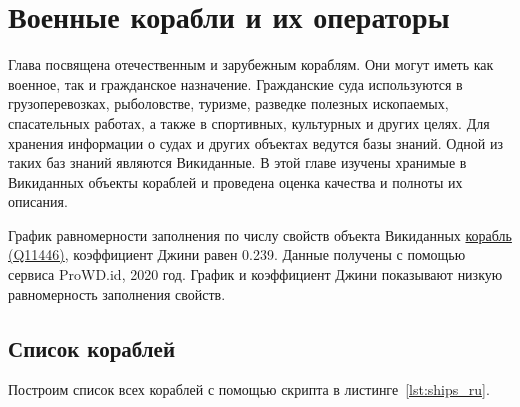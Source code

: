 \chapter{Военные корабли и их операторы}
\label{ch:ships-chapter}

Глава посвящена отечественным и зарубежным кораблям. Они могут иметь как военное, так и гражданское назначение. Гражданские суда используются в грузоперевозках, рыболовстве, туризме, разведке полезных ископаемых, спасательных работах, а также в спортивных, культурных и других целях. Для хранения информации о судах и других объектах ведутся базы знаний. Одной из таких баз знаний являются Викиданные. В этой главе изучены хранимые в Викиданных объекты кораблей и проведена оценка качества и полноты их описания.


\begin{marginfigure}[0.0cm]
  {
    \setlength{\fboxsep}{0pt}%
    \setlength{\fboxrule}{1pt}%
  }
  \caption[График равномерности заполнения свойств объектов Викиданных.]{График равномерности заполнения по числу свойств объекта Викиданных \href{https://www.wikidata.org/wiki/Q11446}{корабль (Q11446)}, коэффициент Джини равен 0.239. Данные получены с помощью сервиса ProWD.id, 2020 год. График и коэффициент Джини показывают низкую равномерность заполнения свойств.}%
  \label{fig:prowd_ships-unbalanced}%
\end{marginfigure}


\section{Список кораблей}


Построим список всех кораблей с помощью скрипта в листинге~\ref{lst:ships_ru}.

